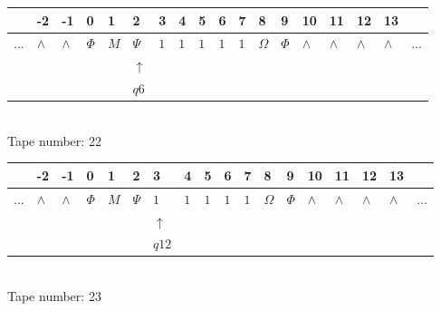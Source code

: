 \documentclass[11pt]{article}
\begin{document}
\begin{table}[H]
\centering
\begin{tabular}{llllllllllllllllll}
 & -2 & -1 & 0 & 1 & 2 & 3 & 4 & 5 & 6 & 7 & 8 & 9 & 10 & 11 & 12 & 13 & \\
\hline
$...$ & \multicolumn{1}{|l|}{$\wedge$} & \multicolumn{1}{|l|}{$\wedge$} & \multicolumn{1}{|l|}{$\Phi$} & \multicolumn{1}{|l|}{$M$} & \multicolumn{1}{|l|}{$\Psi$} & \multicolumn{1}{|l|}{$1$} & \multicolumn{1}{|l|}{$1$} & \multicolumn{1}{|l|}{$1$} & \multicolumn{1}{|l|}{$1$} & \multicolumn{1}{|l|}{$1$} & \multicolumn{1}{|l|}{$\Omega$} & \multicolumn{1}{|l|}{$\Phi$} & \multicolumn{1}{|l|}{$\wedge$} & \multicolumn{1}{|l|}{$\wedge$} & \multicolumn{1}{|l|}{$\wedge$} & \multicolumn{1}{|l|}{$\wedge$} & $...$\\
\hline
&  &  &  &  & $\uparrow$ &  &  &  &  &  &  &  &  &  &  &  &  \\
&  &  &  &  & $ q6 $ &  &  &  &  &  &  &  &  &  &  &  &  \\
\end{tabular}
\\
Tape number: 22
\noindent\makebox[\linewidth]{\hdashrule{\textwidth}{1pt}{1pt}}\end{table}

\begin{table}[H]
\centering
\begin{tabular}{llllllllllllllllll}
 & -2 & -1 & 0 & 1 & 2 & 3 & 4 & 5 & 6 & 7 & 8 & 9 & 10 & 11 & 12 & 13 & \\
\hline
$...$ & \multicolumn{1}{|l|}{$\wedge$} & \multicolumn{1}{|l|}{$\wedge$} & \multicolumn{1}{|l|}{$\Phi$} & \multicolumn{1}{|l|}{$M$} & \multicolumn{1}{|l|}{$\Psi$} & \multicolumn{1}{|l|}{$1$} & \multicolumn{1}{|l|}{$1$} & \multicolumn{1}{|l|}{$1$} & \multicolumn{1}{|l|}{$1$} & \multicolumn{1}{|l|}{$1$} & \multicolumn{1}{|l|}{$\Omega$} & \multicolumn{1}{|l|}{$\Phi$} & \multicolumn{1}{|l|}{$\wedge$} & \multicolumn{1}{|l|}{$\wedge$} & \multicolumn{1}{|l|}{$\wedge$} & \multicolumn{1}{|l|}{$\wedge$} & $...$\\
\hline
&  &  &  &  &  & $\uparrow$ &  &  &  &  &  &  &  &  &  &  &  \\
&  &  &  &  &  & $ q12 $ &  &  &  &  &  &  &  &  &  &  &  \\
\end{tabular}
\\
Tape number: 23
\noindent\makebox[\linewidth]{\hdashrule{\textwidth}{1pt}{1pt}}\end{table}
\clearpage
\end{document}
